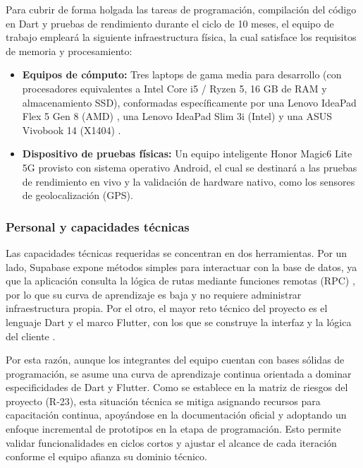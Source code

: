 Para cubrir de forma holgada las tareas de programación, compilación del código en Dart y pruebas de rendimiento durante el ciclo de 10 meses, el equipo de trabajo empleará la siguiente infraestructura física, la cual satisface los requisitos de memoria y procesamiento:
\begin{itemize}
    \item \textbf{Equipos de cómputo:} Tres laptops de gama media para desarrollo (con procesadores equivalentes a Intel Core i5 / Ryzen 5, 16 GB de RAM y almacenamiento SSD), conformadas específicamente por una Lenovo IdeaPad Flex 5 Gen 8 (AMD) \cite{lenovo_flex5}, una Lenovo IdeaPad Slim 3i (Intel) \cite{lenovo_slim3i} y una ASUS Vivobook 14 (X1404) \cite{asus_vivobook}.
    \item \textbf{Dispositivo de pruebas físicas:} Un equipo inteligente Honor Magic6 Lite 5G \cite{telcel_honor} provisto con sistema operativo Android, el cual se destinará a las pruebas de rendimiento en vivo y la validación de hardware nativo, como los sensores de geolocalización (GPS).
\end{itemize}

\subsubsection{Personal y capacidades técnicas}
Las capacidades técnicas requeridas se concentran en dos herramientas. Por un lado, Supabase expone métodos simples para interactuar con la base de datos, ya que la aplicación consulta la lógica de rutas mediante funciones remotas (RPC) \cite{supabase_arquitectura}, por lo que su curva de aprendizaje es baja y no requiere administrar infraestructura propia. Por el otro, el mayor reto técnico del proyecto es el lenguaje Dart y el marco Flutter, con los que se construye la interfaz y la lógica del cliente \cite{supabase_flutter}.

Por esta razón, aunque los integrantes del equipo cuentan con bases sólidas de programación, se asume una curva de aprendizaje continua orientada a dominar especificidades de Dart y Flutter. Como se establece en la matriz de riesgos del proyecto (R-23), esta situación técnica se mitiga asignando recursos para capacitación continua, apoyándose en la documentación oficial y adoptando un enfoque incremental de prototipos en la etapa de programación. Esto permite validar funcionalidades en ciclos cortos y ajustar el alcance de cada iteración conforme el equipo afianza su dominio técnico.